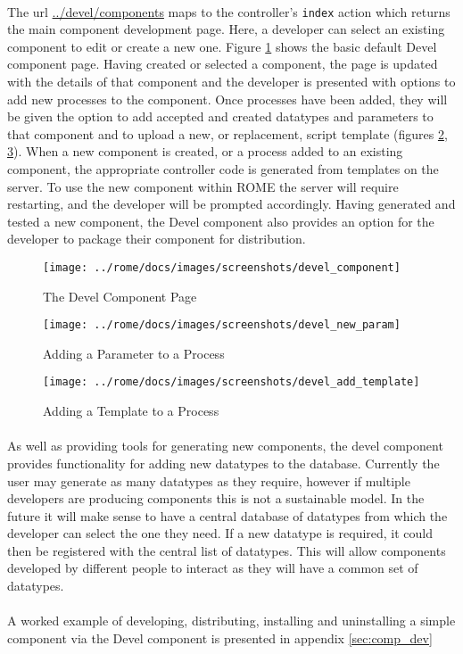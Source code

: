 \paragraph{}
The url \url{../devel/components} maps to the controller's \texttt{index} action which returns the main component development page. Here, a developer can select an existing component to edit or create a new one. Figure \ref{fig:devel_component} shows the basic default Devel component page. Having created or selected a component, the page is updated with the details of that component and the developer is presented with options to add new processes to the component. Once processes have been added, they will be given the option to add accepted and created datatypes and parameters to that component and to upload a new, or replacement, script template (figures \ref{fig:devel_new_param}, \ref{fig:devel_add_template}). When a new component is created, or a process added to an existing component, the appropriate controller code is generated from templates on the server. To use the new component within ROME the server will require restarting, and the developer will be prompted accordingly. Having generated and tested a new component, the Devel component also provides an option for the developer to package their component for distribution.


\begin{figure}[h]
\centering
\texttt{[image: ../rome/docs/images/screenshots/devel\_component]}
\caption{The Devel Component Page}\label{fig:devel_component}
\end{figure}
\clearpage

\begin{figure}[h]
\centering
\texttt{[image: ../rome/docs/images/screenshots/devel\_new\_param]}
\caption{Adding a Parameter to a Process}\label{fig:devel_new_param}
\end{figure}

\begin{figure}[h]
\centering
\texttt{[image: ../rome/docs/images/screenshots/devel\_add\_template]}
\caption{Adding a Template to a Process}\label{fig:devel_add_template}
\end{figure}
\clearpage

\paragraph{}
As well as providing tools for generating new components, the devel component provides functionality for adding new datatypes to the database. Currently the user may generate as many datatypes as they require, however if multiple developers are producing components this is not a sustainable model. In the future it will make sense to have a central database of datatypes from which the developer can select the one they need. If a new datatype is required, it could then be registered with the central list of datatypes. This will allow components developed by different people to interact as they will have a common set of datatypes.

\paragraph{}
A worked example of developing, distributing, installing and uninstalling a simple component via the Devel component is presented in appendix \ref{sec:comp_dev}
